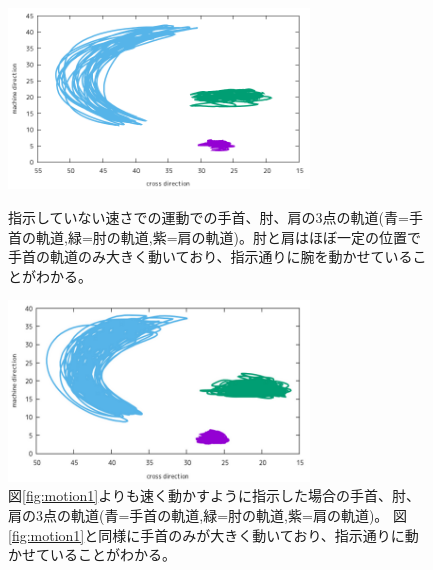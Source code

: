 \documentclass{jsarticle}
\begin{document}
\begin{figure}[htbp]
  \begin{minipage}{0.5\hsize}
    \begin{center}
      \includegraphics[clip,width=80mm]{Graph_2.png}
      \caption{指示していない速さでの運動での手首、肘、肩の3点の軌道(青=手首の軌道,緑=肘の軌道,紫=肩の軌道)。肘と肩はほぼ一定の位置で手首の軌道のみ大きく動いており、指示通りに腕を動かせていることがわかる。\label{fig:motion1}}
    \end{center}
  \end{minipage}
  \begin{minipage}{0.5\hsize}
    \begin{center}
      \includegraphics[clip,width=80mm]{Graph_3.png}
      \caption{図\ref{fig:motion1}よりも速く動かすように指示した場合の手首、肘、肩の3点の軌道(青=手首の軌道,緑=肘の軌道,紫=肩の軌道)。 図\ref{fig:motion1}と同様に手首のみが大きく動いており、指示通りに動かせていることがわかる。\label{fig:motion2}}
    \end{center}
  \end{minipage}
\end{figure}
\end{document}
